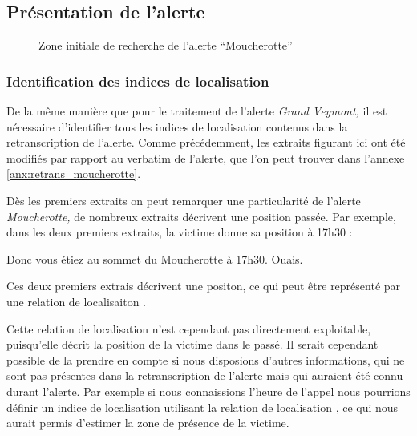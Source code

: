 
\subsection{Présentation de l'alerte}
\label{subsec:9-3-1}




\begin{figure}
  \centering
  
  \caption{Zone initiale de recherche de l'alerte
    \enquote{Moucherotte}}
  \label{fig:zir_moucherotte}
\end{figure}

\subsubsection{Identification des indices de localisation}
\label{subsec:9-3-1-1}

De la même manière que pour le traitement de l'alerte \emph{Grand
  Veymont,} il est nécessaire d'identifier tous les indices de
localisation contenus dans la retranscription de l'alerte. Comme
précédemment, les extraits figurant ici ont été modifiés par rapport
au verbatim de l'alerte, que l'on peut trouver dans l'annexe
\ref{anx:retrans_moucherotte}.



Dès les premiers extraits on peut remarquer une particularité de
l'alerte \emph{Moucherotte,} de nombreux extraits décrivent une
position passée. Par exemple, dans les deux premiers extraits, la
victime donne sa position à 17h30 :
% 
\begin{dialogue*}
  \Sec {} Donc vous étiez au sommet du Moucherotte à 17h30.
  \Req {} Ouais.
\end{dialogue*}

Ces deux premiers extrais décrivent une positon,
%
ce qui peut être
représenté par une relation de localisaiton .

Cette relation de localisation n'est cependant pas directement
exploitable, puisqu'elle décrit la position de la victime dans le
passé.
%
Il serait cependant possible de la prendre en compte si nous
disposions d'autres informations, qui ne sont pas présentes dans la
retranscription de l'alerte mais qui auraient été connu durant
l'alerte.
%
Par exemple si nous connaissions l'heure de l'appel nous pourrions
définir un indice de localisation utilisant la relation de
localisation , ce qui nous aurait
permis d'estimer la zone de présence de la victime.



